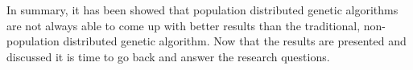 \noindent In summary, it has been showed that population distributed genetic algorithms are not always able to come up with better results than the traditional, non-population distributed genetic algorithm. Now that the results are presented and discussed it is time to go back and answer the research questions.\\

